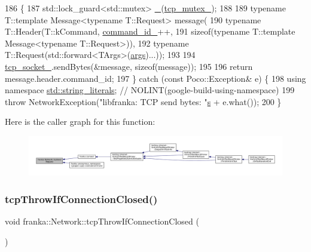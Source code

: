 \begin{DoxyCode}
186                                                     \{
187   std::lock\_guard<std::mutex> \hyperlink{namespacetesting_a4ba77a3f5b67166ff1b59d96a32346a2}{\_}(\hyperlink{classfranka_1_1Network_a8649d1cc6577ba09f7444c298905a11d}{tcp\_mutex\_});
188 
189   \textcolor{keyword}{typename} T::template Message<typename T::Request> message(
190       \textcolor{keyword}{typename} T::Header(T::kCommand, \hyperlink{classfranka_1_1Network_a3c0593618dbdedb1edb9ef2ef9392f19}{command\_id\_}++,
191                          \textcolor{keyword}{sizeof}(\textcolor{keyword}{typename} T::template Message<typename T::Request>)),
192       \textcolor{keyword}{typename} T::Request(std::forward<TArgs>(\hyperlink{namespacegenerate__debs_a75f9143e38df82d83b2e8a6f99cae02c}{args})...));
193 
194   \hyperlink{classfranka_1_1Network_a2c26c04f9ccb9792074799b101ee53e9}{tcp\_socket\_}.sendBytes(&message, \textcolor{keyword}{sizeof}(message));
195 
196   \textcolor{keywordflow}{return} message.header.command\_id;
197 \} \textcolor{keywordflow}{catch} (\textcolor{keyword}{const} Poco::Exception& e) \{
198   \textcolor{keyword}{using namespace }\hyperlink{namespacestd_1_1string__literals}{std::string\_literals};  \textcolor{comment}{// NOLINT(google-build-using-namespace)}
199   \textcolor{keywordflow}{throw} NetworkException(\textcolor{stringliteral}{"libfranka: TCP send bytes: "}\hyperlink{namespaceservice__node__3_aa976421a49e0b54f23833423400849ae}{s} + e.what());
200 \}
\end{DoxyCode}
Here is the caller graph for this function\+:
\nopagebreak
\begin{figure}[H]
\begin{center}
\leavevmode
\includegraphics[width=350pt]{classfranka_1_1Network_abcb70ba573d7a6767b205dc6a89183f8_icgraph}
\end{center}
\end{figure}
\mbox{\label{classfranka_1_1Network_ab1422a98fe11284ec48e1b85ddd8303d}} 
\subsubsection{\texorpdfstring{tcp\+Throw\+If\+Connection\+Closed()}{tcpThrowIfConnectionClosed()}}
{\footnotesize\ttfamily void franka\+::\+Network\+::tcp\+Throw\+If\+Connection\+Closed (\begin{DoxyParamCaption}{ }\end{DoxyParamCaption})}



